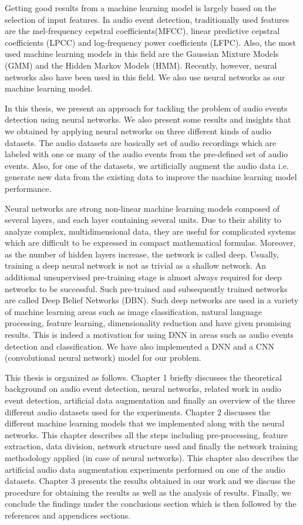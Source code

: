 Getting good results from a machine learning model is largely based on the selection of input features. In audio event detection, traditionally used features are the mel-frequency cepstral coefficients(MFCC), linear predictive cepstral coefficients (LPCC) and log-frequency power coefficients (LFPC). Also, the most used machine learning models in this field are the Gaussian Mixture Models (GMM) and the Hidden Markov Models (HMM). Recently, however, neural networks also have been used in this field. We also use neural networks as our machine learning model.

In this thesis, we present an approach for tackling the problem of audio events detection using  neural networks. We also present some results and insights that we obtained by applying neural networks on three different kinds of audio datasets. The audio datasets are basically set of audio recordings which are labeled with one or many of the audio events from the pre-defined set of audio events. Also, for one of the datasets, we artificially augment the audio data i.e. generate new data from the existing data to improve the machine learning model performance. 

Neural networks are strong non-linear machine learning models composed of several layers, and each layer containing several units. Due to their ability to analyze complex, multidimensional data, they are useful for complicated systems which are difficult to be expressed in compact mathematical formulas. Moreover, as the number of hidden layers increase, the network is called deep. Usually, training a deep neural network is not as trivial as a shallow network. An additional unsupervised pre-training stage is almost always required for deep networks to be successful. Such pre-trained and subsequently trained networks are called Deep Belief Networks (DBN). Such deep networks are used in a variety of machine learning areas such as image classification, natural language processing, feature learning, dimensionality reduction and have given promising results. This is indeed a motivation for using DNN in areas such as audio events detection and classification. We have also implemented a DNN and a CNN (convolutional neural network) model for our problem.

This thesis is organized as follows. Chapter 1 briefly discusses the theoretical background on audio event detection, neural networks, related work in audio event detection, artificial data augmentation and finally an overview of the three different audio datasets used for the experiments. Chapter 2 discusses the different machine learning models that we implemented along with the neural networks. This chapter describes all the steps including pre-processing, feature extraction, data division, network structure used  and finally the network training methodology applied (in case of neural networks). This chapter also describes the artificial audio data augmentation experiments performed on one of the audio datasets.  Chapter 3 presents the results obtained in our work and we discuss the procedure for obtaining the results as well as the analysis of results. Finally, we conclude the findings under the conclusions section which is then followed by the references and appendices sections.